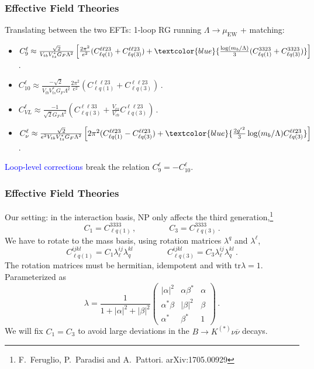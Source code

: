 \documentclass[mathserif, 10pt]{beamer}
\begin{document}
\begin{frame}
    \frametitle{Effective Field Theories}
    Translating between the two EFTs: 1-loop RG running $\Lambda \to \mu_\mathrm{EW}$ + matching:
    \begin{itemize}
        \item {\small $C_9^\ell \approx \frac{\sqrt{2}}{V_{tb}V_{ts}^* G_F \Lambda^2}\left[ \frac{2\pi^2}{e^2}(C_{\ell q(1)}^{\ell\ell23}+C_{\ell q(3)}^{\ell\ell23}) + \textcolor{blue}{\frac{\log(m_b/\Lambda)}{3}(C_{\ell q(1)}^{3323}+C_{\ell q(3)}^{3323})}\right]\, $.}
        \item {\small $C_{10}^\ell \approx \frac{-\sqrt{2}}{V_{tb}V_{ts}^* G_F \Lambda^2} \frac{2\pi^2}{e^2}(C_{\ell q(1)}^{\ell\ell23}+C_{\ell q(3)}^{\ell\ell23}) \, $.}
\item {\small $C_{VL}^\ell \approx \frac{-1}{\sqrt{2}G_F\Lambda^2}\left(C_{\ell q(3)}^{\ell\ell33}+ \frac{V_{cs}}{V_{cb}}C_{\ell q(3)}^{\ell\ell 23}\right)$\,.}
        \item {\small $C_\nu^\ell \approx \frac{\sqrt{2}}{e^2 V_{tb}V_{ts}^* G_F \Lambda^2}\left[2\pi^2(C_{\ell q(1)}^{\ell\ell 23}-C_{\ell q(3)}^{\ell\ell 23})+\textcolor{blue}{\frac{2{g'}^2}{3}\log(m_b/\Lambda)C_{\ell q(3)}^{\ell\ell 23}}\right]\,$.}
    \end{itemize}

\textcolor{blue}{Loop-level corrections} break the relation $C_9^\ell = -C_{10}^\ell$.
\end{frame}

\begin{frame}
    \frametitle{Effective Field Theories}

    Our setting: in the interaction basis, NP only affects the third generation,\footnote[1]{F.~Feruglio, P.~Paradisi and A.~Pattori. arXiv:1705.00929}
    $$C_1 = C_{\ell q(1)}^{3333}\,,\qquad\qquad C_3 = C_{\ell q(3)}^{3333}\,.$$
    We have to rotate to the mass basis, using rotation matrices $\lambda^q$ and $\lambda^\ell$,
    $$C_{\ell q(1)}^{ijkl} = C_1 \lambda_\ell^{ij}\lambda_q^{kl}\,\qquad\qquad C_{\ell q(3)}^{ijkl} = C_3 \lambda_\ell^{ij}\lambda_q^{kl}\,. $$
    The rotation matrices must be hermitian, idempotent and with $\mathrm{tr}\lambda =1$. Parameterized as
    $$ \lambda = \frac{1}{1+|\alpha|^2+|\beta|^2}\begin{pmatrix}
            |\alpha|^2 & \alpha \beta^* & \alpha \\ \alpha^* \beta & |\beta|^2 & \beta \\ \alpha^* & \beta^* & 1
        \end{pmatrix}\,. $$
    We will fix $C_1 = C_3$ to avoid large deviations in the $B\to K^{(*)}\nu\overline{\nu}$ decays.
\end{frame}
\end{document}
